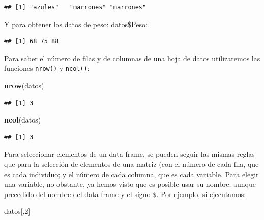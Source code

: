 \documentclass[
]{book}
\newenvironment{Shaded}{\begin{snugshade}}{\end{snugshade}}
\newcommand{\DecValTok}[1]{\textcolor[rgb]{0.00,0.00,0.81}{#1}}
\newcommand{\FunctionTok}[1]{\textcolor[rgb]{0.13,0.29,0.53}{\textbf{#1}}}
\newcommand{\NormalTok}[1]{#1}
\newcommand{\SpecialCharTok}[1]{\textcolor[rgb]{0.81,0.36,0.00}{\textbf{#1}}}
\begin{document}
\begin{verbatim}
## [1] "azules"   "marrones" "marrones"
\end{verbatim}

Y para obtener los datos de peso: datos\$Peso:

\begin{Shaded}
\end{Shaded}

\begin{verbatim}
## [1] 68 75 88
\end{verbatim}

Para saber el número de filas y de columnas de una hoja de datos utilizaremos las funciones \texttt{nrow()} y \texttt{ncol()}:

\begin{Shaded}
\begin{Highlighting}[]
\FunctionTok{nrow}\NormalTok{(datos)}
\end{Highlighting}
\end{Shaded}

\begin{verbatim}
## [1] 3
\end{verbatim}

\begin{Shaded}
\begin{Highlighting}[]
\FunctionTok{ncol}\NormalTok{(datos)}
\end{Highlighting}
\end{Shaded}

\begin{verbatim}
## [1] 3
\end{verbatim}

Para seleccionar elementos de un data frame, se pueden seguir las mismas reglas que para la selección de elementos de una matriz (con el número de cada fila, que es cada individuo; y el número de cada columna, que es cada variable. Para elegir una variable, no obstante, ya hemos visto que es posible usar su nombre; aunque precedido del nombre del data frame y el signo \texttt{\$}. Por ejemplo, si ejecutamos:

\begin{Shaded}
\begin{Highlighting}[]
\NormalTok{datos[,}\DecValTok{2}\NormalTok{]}
\end{Highlighting}
\end{Shaded}
\end{document}
